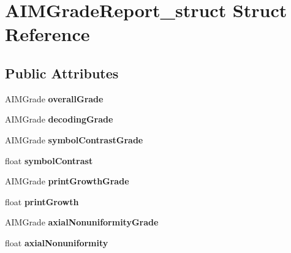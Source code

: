 \hypertarget{structAIMGradeReport__struct}{
\section{AIMGradeReport\_\-struct Struct Reference}
\label{structAIMGradeReport__struct}
}
\subsection*{Public Attributes}
\begin{DoxyCompactItemize}
\item 
\hypertarget{structAIMGradeReport__struct_abdea17aeceb213fcd21796799125467d}{
AIMGrade {\bfseries overallGrade}}
\label{structAIMGradeReport__struct_abdea17aeceb213fcd21796799125467d}

\item 
\hypertarget{structAIMGradeReport__struct_a790f479f2593738df0688f1a9a73914f}{
AIMGrade {\bfseries decodingGrade}}
\label{structAIMGradeReport__struct_a790f479f2593738df0688f1a9a73914f}

\item 
\hypertarget{structAIMGradeReport__struct_a30a92fb152f130307721968315bd4b67}{
AIMGrade {\bfseries symbolContrastGrade}}
\label{structAIMGradeReport__struct_a30a92fb152f130307721968315bd4b67}

\item 
\hypertarget{structAIMGradeReport__struct_adec59fed133a0a7d7c6144f5f8181c24}{
float {\bfseries symbolContrast}}
\label{structAIMGradeReport__struct_adec59fed133a0a7d7c6144f5f8181c24}

\item 
\hypertarget{structAIMGradeReport__struct_aa34d3dffaad22d0d777d5732287c4b06}{
AIMGrade {\bfseries printGrowthGrade}}
\label{structAIMGradeReport__struct_aa34d3dffaad22d0d777d5732287c4b06}

\item 
\hypertarget{structAIMGradeReport__struct_ad1338838e04aa6abba0f67fcc9fafb36}{
float {\bfseries printGrowth}}
\label{structAIMGradeReport__struct_ad1338838e04aa6abba0f67fcc9fafb36}

\item 
\hypertarget{structAIMGradeReport__struct_a321f2af2c5531a99ebf49943bc582802}{
AIMGrade {\bfseries axialNonuniformityGrade}}
\label{structAIMGradeReport__struct_a321f2af2c5531a99ebf49943bc582802}

\item 
\hypertarget{structAIMGradeReport__struct_a9051221bdeeabde7a2e18153cae3fdb4}{
float {\bfseries axialNonuniformity}}
\label{structAIMGradeReport__struct_a9051221bdeeabde7a2e18153cae3fdb4}


\end{DoxyCompactItemize}
